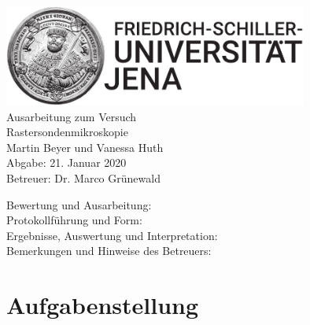 \documentclass[a4paper,twoside,final]{article}
\begin{document}
\setlength{\marginparsep}{2em}
\renewcommand{\theequation}{\arabic{section}.\arabic{equation}}
\renewcommand{\thefigure}{\arabic{section}.\arabic{figure}}
\renewcommand{\thetable}{\arabic{section}.\arabic{table}}

\begin{center}
\thispagestyle{empty}
  \includegraphics[width=0.75\textwidth]{../UniJena_BildWortMarke_black.pdf}\\[4em]
  \Large
  Ausarbeitung zum Versuch\\[2em]
  \Huge
  Rastersondenmikroskopie\\
  \vspace{2cm}
  \Large
  Martin Beyer und Vanessa Huth\\[2em]
  Abgabe: 21. Januar 2020\\[2em]
  Betreuer: Dr. Marco Grünewald\\[5em]
  \begin{flushleft}
  	Bewertung und Ausarbeitung:\\[2em]
		Protokollführung und Form:\\[1em]
		Ergebnisse, Auswertung und Interpretation:\\[1em]
		Bemerkungen und Hinweise des Betreuers:
  \end{flushleft}
\end{center}
\clearpage

\pagestyle{fancy}
\renewcommand{\headrulewidth}{0pt}
\renewcommand{\footrulewidth}{0.5pt}
\renewcommand{\sectionmark}[1]{\markright{#1}}
\fancyhead[RE,LO]{\rightmark}
\fancyfoot[LE,RO]{\bfseries\thepage}
\renewcommand{\headrulewidth}{0.5pt}
\renewcommand{\footrulewidth}{0.5pt}

\setcounter{equation}{0}
\setcounter{figure}{0}

\tableofcontents
\newpage
\section{Aufgabenstellung} \label{sec:Aufgabenstellung}
\end{document}
